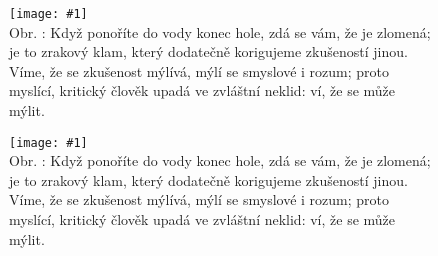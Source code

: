\documentclass{article}
\newlength{\imagewidth}
\def\obr#1#2{%
\stepcounter{figure}%
\parbox[t]{\imagewidth}{%
\texttt{[image: \#1]}\\
Obr. \thefigure: #2}%
}
\def\dvaobr#1#2#3#4{
\begin{figure}[h]
\noindent\obr{#1}{#2}\hspace*{\fill}\obr{#3}{#4}
\end{figure}}
\begin{document}
\dvaobr{img/image01.eps}{%
Když ponoříte do vody konec hole, zdá se vám, že je zlomená; je to zrakový klam, který dodatečně korigujeme zkušeností jinou. Víme, že se zkušenost mýlívá, mýlí se smyslové i rozum; proto myslící, kritický člověk upadá ve zvláštní neklid: ví, že se může mýlit.
}%
{img/image01.eps}{%
Když ponoříte do vody konec hole, zdá se vám, že je zlomená; je to zrakový klam, který dodatečně korigujeme zkušeností jinou. Víme, že se zkušenost mýlívá, mýlí se smyslové i rozum; proto myslící, kritický člověk upadá ve zvláštní neklid: ví, že se může mýlit.
}
\end{document}
